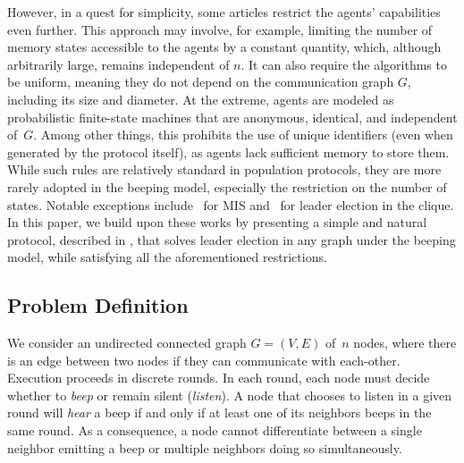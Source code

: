 \documentclass{article}
\begin{document}
However, in a quest for simplicity, some articles restrict the agents' capabilities even further. This approach may involve, for example, limiting the number of memory states accessible to the agents by a constant quantity, which, although arbitrarily large, remains independent of $n$. It can also require the algorithms to be uniform, meaning they do not depend on the communication graph $G$, including its size and diameter.
At the extreme, agents are modeled as probabilistic finite-state machines that are anonymous, identical, and independent of~$G$. Among other things, this prohibits the use of unique identifiers (even when generated by the protocol itself), as agents lack sufficient memory to store them. While such rules are relatively standard in population protocols, they are more rarely adopted in the beeping model, especially the restriction on the number of states. Notable exceptions include~\cite{giakkoupis_distributed_2023} for MIS and~\cite{gilbert_computational_2015} for leader election in the clique.
In this paper, we build upon these works by presenting a simple and natural protocol, described in , that solves leader election in any graph under the beeping model, while satisfying all the aforementioned restrictions.

\subsection{Problem Definition} \label{sec:problem_def}

We consider an undirected connected graph $G = (V , E)$ of~$n$ nodes, where there is an edge between two nodes if they can communicate with each-other.
Execution proceeds in discrete rounds. In each round, each node must decide whether to {\em beep} or remain silent ({\em listen}). A node that chooses to listen in a given round will {\em hear} a beep if and only if at least one of its neighbors beeps in the same round. As a consequence, a node cannot differentiate between a single neighbor emitting a beep or multiple neighbors doing so simultaneously.
\end{document}
